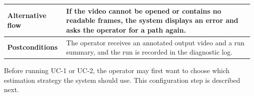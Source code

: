 \begin{longtable}{|
    >{\raggedright\arraybackslash}p{3.0cm}|
    >{\raggedright\arraybackslash}p{\dimexpr\textwidth-3.0cm-4\tabcolsep-3\arrayrulewidth\relax}|
}
\textbf{Alternative flow} &
If the video cannot be opened or contains no readable frames, the system displays an error and asks the operator for a path again.
\\
\hline

\textbf{Postconditions} &
The operator receives an annotated output video and a run summary, and the run is recorded in the diagnostic log.
\\
\hline

\end{longtable}


Before running UC-1 or UC-2, the operator may first want to choose which estimation strategy the system should use. This configuration step is described next.

